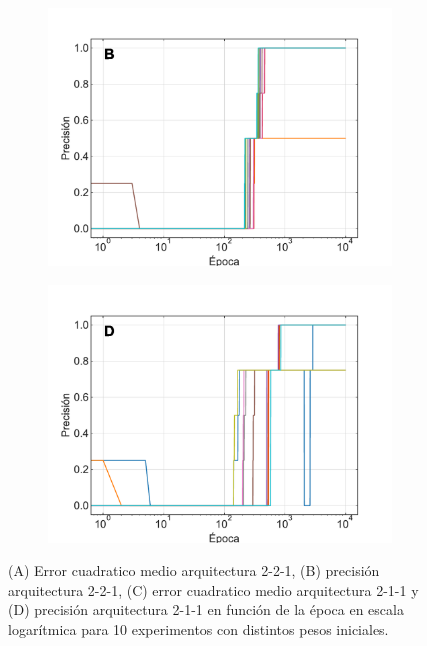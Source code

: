 \documentclass[11pt,twocolumn,twoside]{opticajnl}
\begin{document}
\begin{figure}[h]
\begin{subfigure}[b]{0.49\linewidth}
            \includegraphics[width=1.1\textwidth]{Figuras/acc_ej1a.pdf}
         \end{subfigure}
         \begin{subfigure}[b]{0.49\linewidth}
            \centering
            \includegraphics[width=1.1\textwidth]{Figuras/acc_ej1b.pdf}
         \end{subfigure}
    \caption{(A) Error cuadratico medio arquitectura 2-2-1, (B) precisión arquitectura 2-2-1, (C) error cuadratico medio arquitectura 2-1-1 y (D) precisión arquitectura 2-1-1 en función de la época en escala logarítmica para 10 experimentos con distintos pesos iniciales.} 
    \label{fig:1}
\end{figure}
\end{document}
